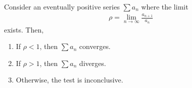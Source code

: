 \documentclass{article}
\begin{document}
\begin{theorem}
  Consider an eventually positive series $\sum a_n$ where the limit
  \begin{align}
    \rho = \lim_{n \to \infty} \frac{a_{n + 1}}{a_n}
  \end{align}
  exists.
  Then,
  \begin{enumerate}
    \item If $\rho < 1$, then $\sum a_n$ converges.
    \item If $\rho > 1$, then $\sum a_n$ diverges.
    \item Otherwise, the test is inconclusive.
  \end{enumerate}
\end{theorem}
\end{document}
